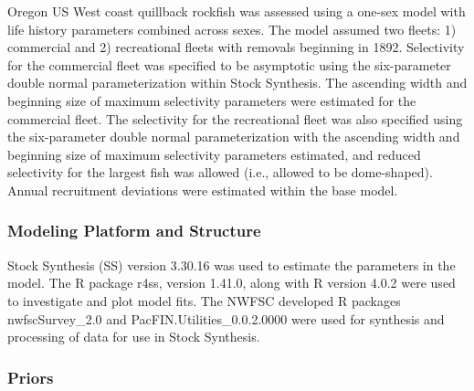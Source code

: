 \documentclass[11pt,
  english,
  a4paper,
]{article}
\begin{document}
\leavevmode\tagmcend\tagstructend


Oregon US West coast quillback rockfish was assessed using a one-sex model with life history parameters combined across sexes. The model assumed two fleets: 1) commercial and 2) recreational fleets with removals beginning in 1892. Selectivity for the commercial fleet was specified to be asymptotic using the six-parameter double normal parameterization within Stock Synthesis. The ascending width and beginning size of maximum selectivity parameters were estimated for the commercial fleet. The selectivity for the recreational fleet was also specified using the six-parameter double normal parameterization with the ascending width and beginning size of maximum selectivity parameters estimated, and reduced selectivity for the largest fish was allowed (i.e., allowed to be dome-shaped). Annual recruitment deviations were estimated within the base model.

\leavevmode\tagmcend\tagstructend\par


\hypertarget{modeling-platform-and-structure}{%
\subsubsection{Modeling Platform and Structure}\label{modeling-platform-and-structure}}

\leavevmode\tagmcend\tagstructend


Stock Synthesis (SS) version 3.30.16 was used to estimate the parameters in the model. The R package r4ss, version 1.41.0, along with R version 4.0.2 were used to investigate and plot model fits. The NWFSC developed R packages nwfscSurvey\_2.0 and PacFIN.Utilities\_0.0.2.0000 were used for synthesis and processing of data for use in Stock Synthesis.

\leavevmode\tagmcend\tagstructend\par


\hypertarget{priors}{%
\subsubsection{Priors}\label{priors}}
\end{document}
